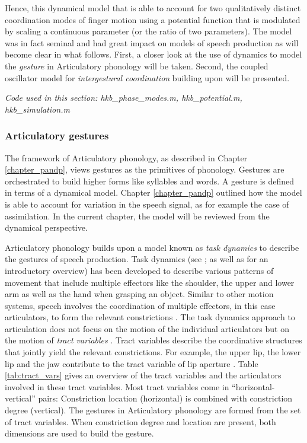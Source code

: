 Hence, this dynamical model that is able to account for two qualitatively distinct coordination modes of finger motion using a potential function that is modulated by scaling a continuous parameter (or the ratio of two parameters). The model was in fact seminal and had great impact on models of speech production as will become clear in what follows. First, a closer look at the use of dynamics to model the \emph{gesture} in Articulatory phonology will be taken. Second, the coupled oscillator model for \emph{intergestural coordination} building upon \citet{HakenKelsoBunz1985} will be presented.


\medskip\noindent \textit{Code used in this section: hkb\_phase\_modes.m, hkb\_potential.m, hkb\_simulation.m}

\subsubsection{Articulatory gestures}

The framework of Articulatory phonology, as described in Chapter \ref{chapter_pandp}, views gestures as the primitives of phonology. Gestures are orchestrated to build higher forms like syllables and words. A gesture is defined in terms of a dynamical model. Chapter \ref{chapter_pandp} outlined how the model is able to account for variation in the speech signal, as for example the case of assimilation. In the current chapter, the model will be reviewed from the dynamical perspective.

Articulatory phonology builds upon a model known as \emph{task dynamics} to describe the gestures of speech production. Task dynamics (see \citealp{Saltzman1986, SaltzmanKelso1987, Saltzman1991}; as well as \citealp{Hawkins1992} for an introductory overview) has been developed to describe various patterns of movement that include multiple effectors like the shoulder, the upper and lower arm as well as the hand when grasping an object. Similar to other motion systems, speech involves the coordination of multiple effectors, in this case articulators, to form the relevant constrictions \citep{BrowmanGoldstein1989}. The task dynamics approach to articulation does not focus on the motion of the individual articulators but on the motion of \emph{tract variables} \citep{BrowmanGoldstein1992}. Tract variables describe the coordinative structures that jointly yield the relevant constrictions. For example, the upper lip, the lower lip and the jaw contribute to the tract variable of lip aperture \citep{BrowmanGoldstein1992}. Table \ref{tab:tract_vars} gives an overview of the tract variables and the articulators involved in these tract variables. Most tract variables come in “horizontal-vertical” pairs: Constriction location (horizontal) is combined with constriction degree (vertical). The gestures in Articulatory phonology are formed from the set of tract variables. When constriction degree and location are present, both dimensions are used to build the gesture.

